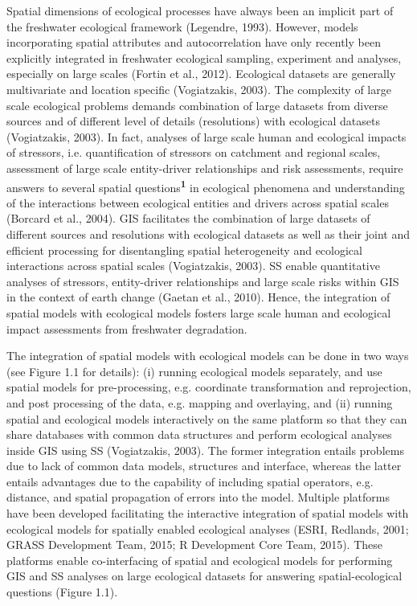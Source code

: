\bigskip

Spatial dimensions of ecological processes have always been an implicit part of the freshwater ecological framework (Legendre, 1993). However, models incorporating spatial attributes and autocorrelation have only recently been explicitly integrated in freshwater ecological sampling, experiment and analyses, especially on large scales (Fortin et al., 2012). Ecological datasets are generally multivariate and location specific (Vogiatzakis, 2003). The complexity of large scale ecological problems demands combination of large datasets from diverse sources and of different level of details (resolutions) with ecological datasets (Vogiatzakis, 2003). In fact, analyses of large scale human and ecological impacts of stressors, i.e. quantification of stressors on catchment and regional scales, assessment of large scale entity-driver relationships and risk assessments, require answers to several spatial questions\textsuperscript{\textbf{1}} in ecological phenomena and understanding of the interactions between ecological entities and drivers across spatial scales (Borcard et al., 2004). GIS facilitates the combination of large datasets of different sources and resolutions with ecological datasets as well as their joint and efficient processing for disentangling spatial heterogeneity and ecological interactions across spatial scales (Vogiatzakis, 2003). SS enable quantitative analyses of stressors, entity-driver relationships and large scale risks within GIS in the context of earth change (Gaetan et al., 2010). Hence, the integration of spatial models with ecological models fosters large scale human and ecological impact assessments from freshwater degradation.

The integration of spatial models with ecological models can be done in two ways (see Figure 1.1 for details): (i) running ecological models separately, and use spatial models for pre-processing, e.g. coordinate transformation and reprojection, and post processing of the data, e.g. mapping and overlaying, and (ii) running spatial and ecological models interactively on the same platform so that they can share databases with common data structures and perform ecological analyses inside GIS using SS (Vogiatzakis, 2003). The former integration entails problems due to lack of common data models, structures and interface, whereas the latter entails advantages due to the capability of including spatial operators, e.g. distance, and spatial propagation of errors into the model. Multiple platforms have been developed facilitating the interactive integration of spatial models with ecological models for spatially enabled ecological analyses (ESRI, Redlands, 2001; GRASS Development Team, 2015; R Development Core Team, 2015). These platforms enable co-interfacing of spatial and ecological models for performing GIS and SS analyses on large ecological datasets for answering spatial-ecological questions (Figure 1.1).

